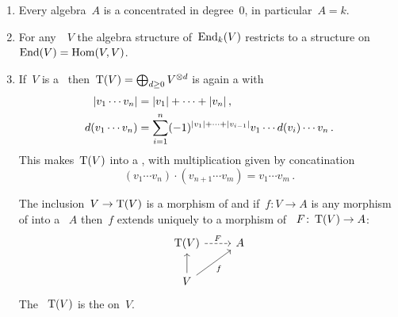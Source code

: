 \documentclass[a4paper,10pt,headings=standardclasses]{scrartcl}
\begin{document}
\begin{examples}
  \leavevmode
  \begin{enumerate}
    \item
      Every algebra~$A$ is a {\dga} concentrated in degree~$0$, in particular~$A = k$.
    \item
      For any~{\dgv}~$V$ the algebra structure of~$\operatorname{End}_k(V)$ restricts to a {\dga} structure on~$\operatorname{End}(V) = \operatorname{Hom}(V,V)$.
    \item
      If~$V$ is a~{\dgv} then~$\operatorname{T}(V) = \bigoplus_{d \geq 0} V^{\otimes d}$ is again a {\dgv} with
      \begin{align*}
        \lvert v_1 \dotsm v_n\rvert
        &=
        \lvert v_1\rvert + \dotsb + \lvert v_n\rvert \,,
      \\
        d(v_1 \dotsm v_n)
        &=
        \sum_{i=1}^n
        (-1)^{\lvert v_1\rvert + \dotsb + \lvert v_{i-1}\rvert}
        v_1 \dotsm d(v_i) \dotsm v_n \,.
      \end{align*}
      This makes~$\operatorname{T}(V)$ into a {\dga}, with multiplication given by concatination
      \[
        (v_1 \dotsm v_n) \cdot (v_{n+1} \dotsm v_m)
        =
        v_1 \dotsm v_m \,.
      \]

      The inclusion~$V \to \operatorname{T}(V)$ is a morphism of {\dgvs} and if~$f \colon V \to A$ is any morphism of {\dgvs} into a {\dga}~$A$ then~$f$ extends uniquely to a morphism of {\dgas}~$F \colon \operatorname{T}(V) \to A$:
      \[
        \begin{tikzcd}
          \dgTensor(V)
          \arrow[dashed]{r}[above]{F}
          &
          A
          \\
          V
          \arrow{u}
          \arrow{ur}[below right]{f}
          &
          {}
        \end{tikzcd}
      \]
      The {\dga}~$\operatorname{T}(V)$ is the  on~$V$.
  \end{enumerate}
\end{examples}
\end{document}
